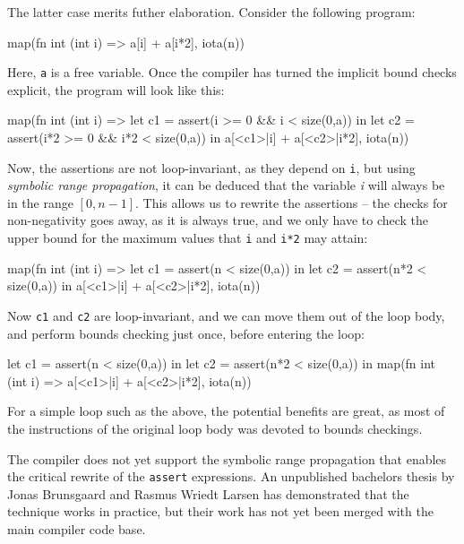 The latter case merits futher elaboration.  Consider the following
program:

\begin{colorcode}
map(fn int (int i) =>
      a[i] + a[i*2],
    iota(n))
\end{colorcode}

Here, \texttt{a} is a free variable.  Once the compiler has turned the
implicit bound checks explicit, the program will look like this:

\begin{colorcode}
map(fn int (int i) =>
      let c1 = assert(i   >= 0 && i   < size(0,a)) in
      let c2 = assert(i*2 >= 0 && i*2 < size(0,a)) in
      a[<c1>|i] + a[<c2>|i*2],
    iota(n))
\end{colorcode}

Now, the assertions are not loop-invariant, as they depend on
\texttt{i}, but using \textit{symbolic range
  propagation}\cite{blume1995symbolic}, it can be deduced that the
variable \textit{i} will always be in the range $[0,n-1]$.  This
allows us to rewrite the assertions -- the checks for non-negativity
goes away, as it is always true, and we only have to check the upper
bound for the maximum values that \texttt{i} and \texttt{i*2} may
attain:

\begin{colorcode}
map(fn int (int i) =>
      let c1 = assert(n   < size(0,a)) in
      let c2 = assert(n*2 < size(0,a)) in
      a[<c1>|i] + a[<c2>|i*2],
    iota(n))
\end{colorcode}

Now \texttt{c1} and \texttt{c2} are loop-invariant, and we can move
them out of the loop body, and perform bounds checking just once,
before entering the loop:

\begin{colorcode}
let c1 = assert(n   < size(0,a)) in
let c2 = assert(n*2 < size(0,a)) in
map(fn int (int i) =>
      a[<c1>|i] + a[<c2>|i*2],
    iota(n))
\end{colorcode}

For a simple loop such as the above, the potential benefits are great,
as most of the instructions of the original loop body was devoted to
bounds checkings.

The \LO{} compiler does not yet support the symbolic range propagation
that enables the critical rewrite of the \texttt{assert} expressions.
An unpublished bachelors thesis by Jonas Brunsgaard and Rasmus Wriedt
Larsen has demonstrated that the technique works in practice, but
their work has not yet been merged with the main compiler code base.


